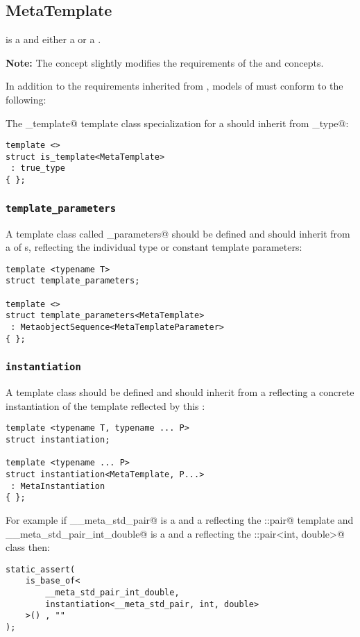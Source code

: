 \subsection{MetaTemplate}
\label{concept-MetaTemplate}

 is a  and either a  or a .

\textbf{Note:} The  concept slightly modifies the requirements
of the  and  concepts.

In addition to the requirements inherited from ,
models of  must conform to the following:

The \verb@is_template@ template class specialization for a  should
inherit from \verb@true_type@:

\begin{verbatim}
template <>
struct is_template<MetaTemplate>
 : true_type
{ };
\end{verbatim}

\subsubsection{\texttt{template\_parameters}}

A template class called \verb@template_parameters@ should be defined and should
inherit from a  of s,
reflecting the individual type or constant template parameters:

\begin{verbatim}
template <typename T>
struct template_parameters;

template <>
struct template_parameters<MetaTemplate>
 : MetaobjectSequence<MetaTemplateParameter>
{ };
\end{verbatim}

\subsubsection{\texttt{instantiation}}

A template class \verb@instantiation@ should be defined and should
inherit from a  reflecting a concrete instantiation of
the template reflected by this :

\begin{verbatim}
template <typename T, typename ... P>
struct instantiation;

template <typename ... P>
struct instantiation<MetaTemplate, P...>
 : MetaInstantiation
{ };
\end{verbatim}

For example if \verb@__meta_std_pair@ is a  and a  reflecting
the \verb@std::pair@ template and \verb@__meta_std_pair_int_double@ is a 
and a  reflecting the \verb@std::pair<int, double>@ class then:

\begin{verbatim}
static_assert(
	is_base_of<
		__meta_std_pair_int_double,
		instantiation<__meta_std_pair, int, double>
	>() , ""
);
\end{verbatim}
